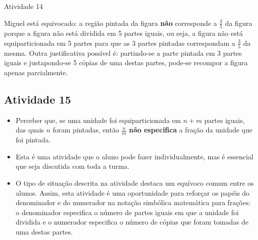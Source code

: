 \begin{multicols}{2}
\begin{resposta*}{Atividade 14}

Miguel está equivocado: a região pintada da figura   {\bf não}   corresponde a   $\frac{3}{5}$ da figura porque a figura não está dividida em 5 partes iguais, ou seja, a figura não está equiparticionada em 5 partes para que as 3 partes pintadas correspondam a   $\frac{3}{5}$ da mesma. Outra justificativa possível é: partindo-se a parte pintada em 3 partes iguais e justapondo-se 5 cópias de uma destas partes, pode-se recompor a figura apenas parcialmente.

\end{resposta*}



\subsection{Atividade 15}

  \vspace{.1cm}

  \begin{itemize} %
    \item       Perceber que, se uma unidade foi equiparticionada em       $n + m$ partes iguais, das quais       $n$ foram pintadas, então       $\frac{n}{m}$     {\bf não especifica}       a fração da unidade que foi pintada.
\end{itemize} %

  \vspace{.1cm}

  \vspace{.1cm}

\begin{itemize} %
    \item       Esta é uma atividade que o aluno pode fazer individualmente, mas é essencial que seja discutida com toda a turma.
    \item       O tipo de situação descrita na atividade destaca um equívoco comum entre os alunos. Assim, esta atividade é uma oportunidade para reforçar os papéis do denominador e do numerador na notação simbólica matemática para frações: o denominador especifica o número de partes iguais em que a unidade foi dividida e o numerador especifica o número de cópias que foram tomadas de uma destas partes.
\end{itemize} %


\end{multicols}
